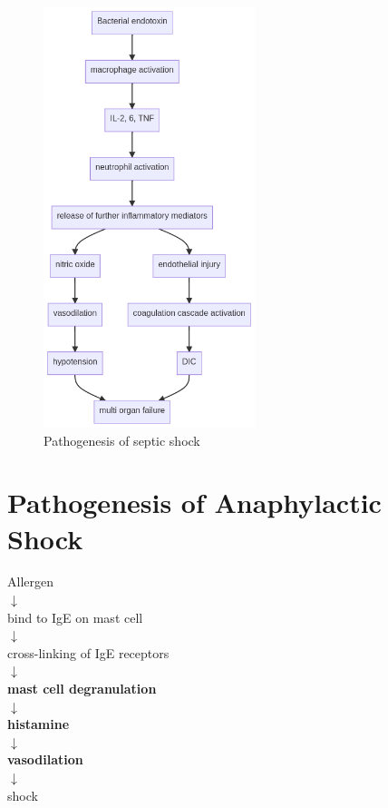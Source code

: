 \documentclass[
  12pt,
]{memoir}
\begin{document}
\begin{figure}
\centering
\includegraphics[width=0.55\textwidth]{../assets/surg/septicshock.png}
\vspace{5mm}
\caption{Pathogenesis of septic shock}
\end{figure}
\pagebreak

\hypertarget{pathogenesis-of-anaphylactic-shock}{%
\section{Pathogenesis of Anaphylactic
Shock}\label{pathogenesis-of-anaphylactic-shock}}

\begin{center}
Allergen \\
 $\downarrow$  \\
 bind to IgE on mast cell  \\
 $\downarrow$  \\
 cross-linking of IgE receptors  \\
 $\downarrow$  \\
 \textbf{mast cell degranulation}  \\
 $\downarrow$  \\
 \textbf{histamine}  \\
 $\downarrow$  \\
 \textbf{vasodilation}\\  
 $\downarrow$  \\
 shock\\
\end{center}
\end{document}
